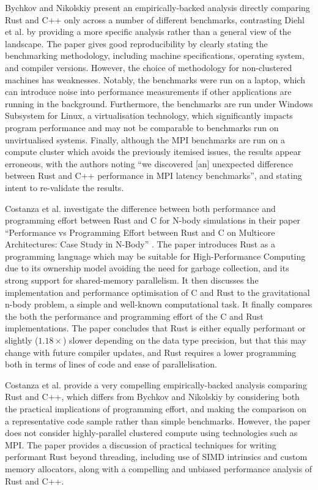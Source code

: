Bychkov and Nikolskiy present an empirically-backed analysis directly comparing Rust and C++ only across a number of different benchmarks, contrasting Diehl et al. by providing a more specific analysis rather than a general view of the landscape. The paper gives good reproducibility by clearly stating the benchmarking methodology, including machine specifications, operating system, and compiler versions. However, the choice of methodology for non-clustered machines has weaknesses. Notably, the benchmarks were run on a laptop, which can introduce noise into performance measurements if other applications are running in the background. Furthermore, the benchmarks are run under Windows Subsystem for Linux, a virtualisation technology, which significantly impacts program performance and may not be comparable to benchmarks run on unvirtualised systems. Finally, although the MPI benchmarks are run on a compute cluster which avoids the previously itemised issues, the results appear erroneous, with the authors noting ``we discovered [an] unexpected difference between Rust and C++ performance in MPI latency benchmarks'', and stating intent to re-validate the results.


Costanza et al. investigate the difference between both performance and programming effort between Rust and C for N-body simulations in their paper ``Performance vs Programming Effort between Rust and C on Multicore Architectures: Case Study in N-Body'' \cite{costanzoPerformanceVsProgramming2021}. The paper introduces Rust as a programming language which may be suitable for High-Performance Computing due to its ownership model avoiding the need for garbage collection, and its strong support for shared-memory parallelism. It then discusses the implementation and performance optimisation of C and Rust to the gravitational n-body problem, a simple and well-known computational task. It finally compares the both the performance and programming effort of the C and Rust implementations. The paper concludes that Rust is either equally performant or slightly ($1.18\times$) slower depending on the data type precision, but that this may change with future compiler updates, and Rust requires a lower programming both in terms of lines of code and ease of parallelisation.

Costanza et al. provide a very compelling empirically-backed analysis comparing Rust and C++, which differs from Bychkov and Nikolskiy by considering both the practical implications of programming effort, and making the comparison on a representative code sample rather than simple benchmarks. However, the paper does not consider highly-parallel clustered compute using technologies such as MPI. The paper provides a discussion of practical techniques for writing performant Rust beyond threading, including use of SIMD intrinsics and custom memory allocators, along with a compelling and unbiased performance analysis of Rust and C++.

